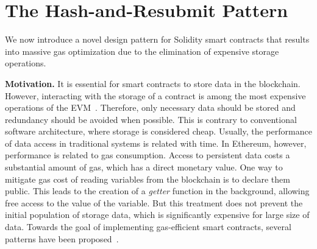 \section{The Hash-and-Resubmit Pattern}

We now introduce a novel design pattern for Solidity smart contracts that
results into massive gas optimization due to the elimination of expensive
storage operations.

\textbf{Motivation.}
It is essential for smart contracts to store data in the blockchain. However,
interacting with the storage of a contract is among the most expensive
operations of the EVM~\cite{wood, buterin}. Therefore, only necessary data
should be stored and redundancy should be avoided when possible. This is
contrary to conventional software architecture, where storage is considered
cheap. Usually, the performance of data access in traditional systems is
related with time. In Ethereum, however, performance is related to gas
consumption. Access to persistent data costs a substantial amount of gas, which
has a direct monetary value. One way to mitigate gas cost of reading variables
from the blockchain is to declare them public.  This leads to the creation of a
\emph{getter} function in the background, allowing free access to the value of
the variable. But this treatment does not prevent the initial population of
storage data, which is significantly expensive for large size of data.
Towards the goal of implementing gas-efficient smart contracts, several
patterns have been proposed~\cite{contract-opt-1, contract-opt-2,
contract-opt-3}.

